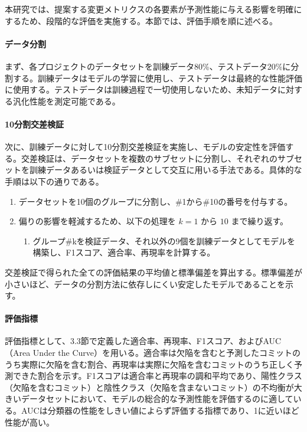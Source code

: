 本研究では、提案する変更メトリクスの各要素が予測性能に与える影響を明確にするため、段階的な評価を実施する。本節では、評価手順を順に述べる。

\paragraph{データ分割}
まず、各プロジェクトのデータセットを訓練データ80\%、テストデータ20\%に分割する。訓練データはモデルの学習に使用し、テストデータは最終的な性能評価に使用する。テストデータは訓練過程で一切使用しないため、未知データに対する汎化性能を測定可能である。

\paragraph{10分割交差検証}
次に、訓練データに対して10分割交差検証を実施し、モデルの安定性を評価する。交差検証は、データセットを複数のサブセットに分割し、それぞれのサブセットを訓練データあるいは検証データとして交互に用いる手法である。具体的な手順は以下の通りである。

\begin{enumerate}
  \item データセットを10個のグループに分割し、\#1から\#10の番号を付与する。
  \item 偏りの影響を軽減するため、以下の処理を $k=1$ から $10$ まで繰り返す。
  \begin{enumerate}
    \item グループ\#kを検証データ、それ以外の9個を訓練データとしてモデルを構築し、F1スコア、適合率、再現率を計算する。
  \end{enumerate}
\end{enumerate}

交差検証で得られた全ての評価結果の平均値と標準偏差を算出する。標準偏差が小さいほど、データの分割方法に依存しにくい安定したモデルであることを示す。

\paragraph{評価指標}
評価指標として、3.3節で定義した適合率、再現率、F1スコア、およびAUC（Area Under the Curve）を用いる。適合率は欠陥を含むと予測したコミットのうち実際に欠陥を含む割合、再現率は実際に欠陥を含むコミットのうち正しく予測できた割合を示す。F1スコアは適合率と再現率の調和平均であり、陽性クラス（欠陥を含むコミット）と陰性クラス（欠陥を含まないコミット）の不均衡が大きいデータセットにおいて、モデルの総合的な予測性能を評価するのに適している。AUCは分類器の性能をしきい値によらず評価する指標であり、1に近いほど性能が高い。

